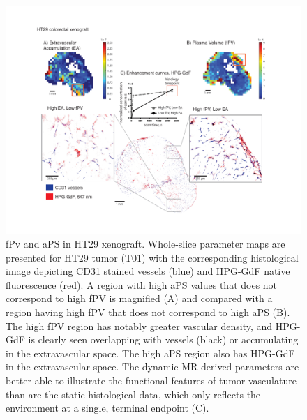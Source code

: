 \begin{figure}[htbp]   
 \begin{center}  
 \includegraphics[width=\textwidth]{hpg/hpg-images/hpg_fig5-ht29fpv.pdf}
 \caption{fPv and aPS in HT29 xenograft. Whole-slice parameter maps are presented for HT29 tumor (T01) with the corresponding histological image depicting CD31 stained vessels (blue) and HPG-GdF native fluorescence (red). A region with high aPS values that does not correspond to high fPV is magnified (A) and compared with a region having high fPV that does not correspond to high aPS (B). The high fPV region has notably greater vascular density, and HPG-GdF is clearly seen overlapping with vessels (black) or accumulating in the extravascular space. The high aPS region also has HPG-GdF in the extravascular space. The dynamic MR-derived parameters are better able to illustrate the functional features of tumor vasculature than are the static histological data, which only reflects the environment at a single, terminal endpoint (C).}  
 \label{hpgpaper:fig5}  
 \end{center}
\end{figure}


